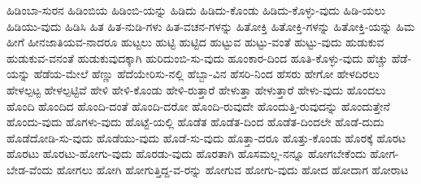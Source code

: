 ಹಿಡಿಂಬಾ-ಸುರನ
ಹಿಡಿಂಬಿಯ
ಹಿಡಿಂಬಿ-ಯನ್ನು
ಹಿಡಿದು
ಹಿಡಿದು-ಕೊಂಡು
ಹಿಡಿದು-ಕೊಳ್ಳು-ವುದು
ಹಿಡಿ-ಯಲು
ಹಿಡಿಯು-ವುದು
ಹಿಡಿಸಿ
ಹಿತ
ಹಿತ-ನುಡಿ-ಗಳು
ಹಿತ-ವಚನ-ಗಳನ್ನು
ಹಿತೋಕ್ತಿ
ಹಿತೋಕ್ತಿ-ಗಳನ್ನು
ಹಿತೋಕ್ತಿ-ಯನ್ನು
ಹಿಮ
ಹೀಗೆ
ಹೀನಜಾತಿಯವ-ನಾದರೂ
ಹುಟ್ಟಲು
ಹುಟ್ಟಿ
ಹುಟ್ಟಿದ
ಹುಟ್ಟುವ
ಹುಟ್ಟು-ವಂತೆ
ಹುಟ್ಟು-ವುದು
ಹುಡುಕುವ
ಹುಡುಕುವ-ವನಂತೆ
ಹುಡುಕುವುದಕ್ಕಾಗಿ
ಹುರಿದುಂಬಿ-ಸು-ವುದು
ಹೂಂಕಾರ-ದಿಂದ
ಹೂತಿ-ಕೊಳ್ಳು-ವುದು
ಹೆಚ್ಚು
ಹೆಡೆ-ಯನ್ನು
ಹೆಡೆಯ-ಮೇಲೆ
ಹೆಣ್ಣು
ಹೆದೆಯೇರಿಸು-ನಲ್ಲಿ
ಹೆಬ್ಬಾ-ವಿನ
ಹೆಸರಿ-ನಿಂದ
ಹೆಸರು
ಹೇಗೋ
ಹೇಳದಿರಲು
ಹೇಳಲ್ಪಟ್ಟ
ಹೇಳಲ್ಪಟ್ಟಿವೆ
ಹೇಳಿ
ಹೇಳಿ-ಕೊಂಡು
ಹೇಳಿ-ರುತ್ತಾರೆ
ಹೇಳುತ್ತಾ
ಹೇಳುತ್ತಾರೆ
ಹೇಳು-ವುದು
ಹೊಂದಲು
ಹೊಂದಿ
ಹೊಂದಿದ
ಹೊಂದಿ-ದಂತೆ
ಹೊಂದಿ-ದರೋ
ಹೊಂದಿ-ರುವುದೇ
ಹೊಂದುತ್ತಿ-ರುವುದನ್ನು
ಹೊಂದುತ್ತೇನೆ
ಹೊಂದು-ವುದು
ಹೊಗಳು-ವುದು
ಹೊಟ್ಟೆ-ಯಲ್ಲಿ
ಹೊಡೆತ
ಹೊಡೆತ-ದಿಂದ
ಹೊಡೆತ-ದಿಂದಲೇ
ಹೊಡೆ-ದುದು
ಹೊಡೆದೋಡಿ-ಸು-ವುದು
ಹೊಡೆಯು-ವುದು
ಹೊಡೆ-ಸು-ವುದು
ಹೊತ್ತಾ-ದರೂ
ಹೊತ್ತು-ಕೊಂಡು
ಹೊರಕ್ಕೆ
ಹೊರಟ
ಹೊರಟು
ಹೊರಟು-ಹೋಗು-ವುದು
ಹೊರಡು-ವುದು
ಹೊರತಾಗಿ
ಹೊಸಮಲ್ಲ-ನನ್ನೂ
ಹೋಗಬೇಕೆಂದು
ಹೋಗ-ಬೇಡ-ವೆಂದು
ಹೋಗಲು
ಹೋಗಿ
ಹೋಗುತ್ತಿದ್ದ-ವ-ರನ್ನು
ಹೋಗುವ
ಹೋಗು-ವುದು
ಹೋದ
ಹೋದಾಗ
ಹೋರಾಟ